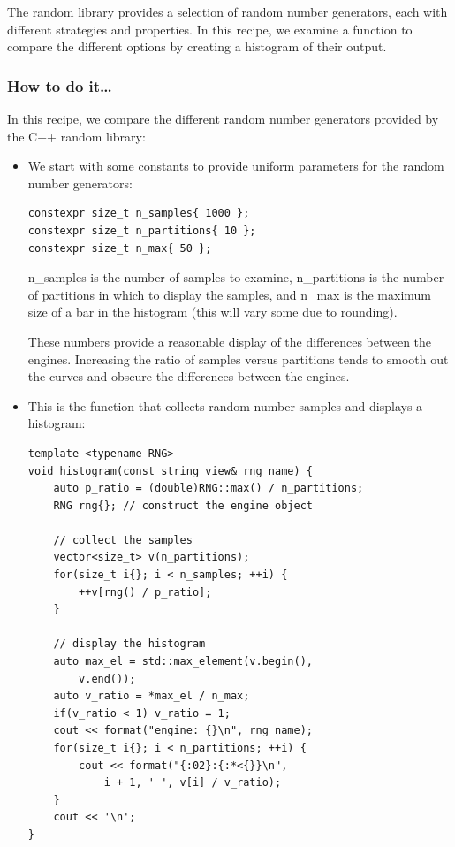
The random library provides a selection of random number generators, each with different strategies and properties. In this recipe, we examine a function to compare the different options by creating a histogram of their output.

\subsubsection{How to do it…}

In this recipe, we compare the different random number generators provided by the C++ random library:

\begin{itemize}
\item 
We start with some constants to provide uniform parameters for the random number generators:

\begin{lstlisting}[style=styleCXX]
constexpr size_t n_samples{ 1000 };
constexpr size_t n_partitions{ 10 };
constexpr size_t n_max{ 50 };
\end{lstlisting}

n\_samples is the number of samples to examine, n\_partitions is the number of partitions in which to display the samples, and n\_max is the maximum size of a bar in the histogram (this will vary some due to rounding).

These numbers provide a reasonable display of the differences between the engines. Increasing the ratio of samples versus partitions tends to smooth out the curves and obscure the differences between the engines.

\item 
This is the function that collects random number samples and displays a histogram:

\begin{lstlisting}[style=styleCXX]
template <typename RNG>
void histogram(const string_view& rng_name) {
	auto p_ratio = (double)RNG::max() / n_partitions;
	RNG rng{}; // construct the engine object
	
	// collect the samples
	vector<size_t> v(n_partitions);
	for(size_t i{}; i < n_samples; ++i) {
		++v[rng() / p_ratio];
	}

	// display the histogram
	auto max_el = std::max_element(v.begin(),
		v.end());
	auto v_ratio = *max_el / n_max;
	if(v_ratio < 1) v_ratio = 1;
	cout << format("engine: {}\n", rng_name);
	for(size_t i{}; i < n_partitions; ++i) {
		cout << format("{:02}:{:*<{}}\n",
			i + 1, ' ', v[i] / v_ratio);
	}
	cout << '\n';
}
\end{lstlisting}



\end{itemize}
